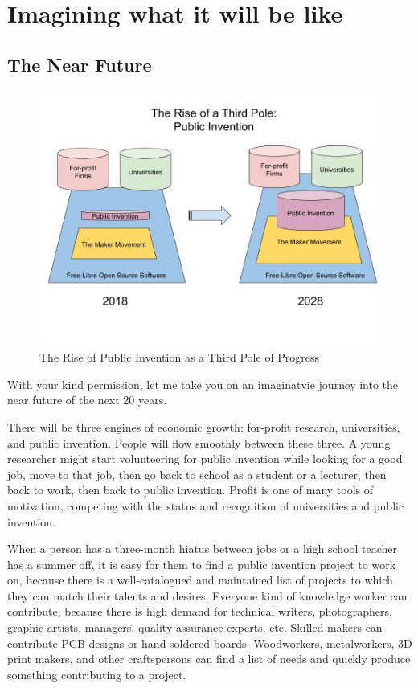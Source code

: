 \documentclass[
	fontsize=10pt, %
	twoside=false, %
	secnumdepth=1, %
]{kaobook}
\begin{document}
\chapter{Imagining what it will be like}

\section{The Near Future}

\begin{figure}
  \includegraphics{figures/The_Rise_of_Public_Invention.jpg}
  \caption{The Rise of Public Invention as a Third Pole of Progress}
\end{figure}

With your kind permission, let me take you on an
imaginatvie journey into the near future of the next 20 years.

There will be three engines of economic growth:
for-profit research, universities, and public invention.
People will flow smoothly between these three.
A young researcher might start volunteering for public invention while
looking for a good job, move to that job, then go back to school
as a student or a lecturer,
then back to work, then back to public invention.
Profit is one of many tools of motivation, competing with
the status and recognition of universities and public invention.

When a person has a three-month hiatus between jobs or a
high school teacher has a summer off, it is easy for them to find
a public invention project to work on, because there is a
well-catalogued and maintained list of projects to which they can  match
their talents and desires.
Everyone kind of knowledge worker can contribute, because
there is high demand for technical writers, photographers,
graphic artists, managers, quality assurance experts, etc.
Skilled makers can contribute PCB designs or hand-soldered boards.
Woodworkers, metalworkers, 3D print makers, and other craftspersons
can find a list of needs and quickly produce something contributing
to a project.
\end{document}
